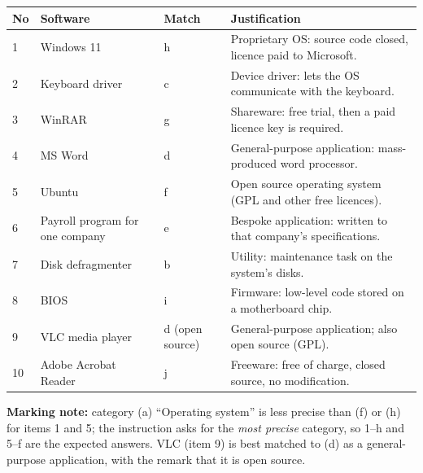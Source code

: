 \documentclass[11pt]{article}
\begin{document}
\begin{corrige}
\begin{center}
\begin{tabularx}{\linewidth}{|l|X|l|X|}
\hline
\rowcolor{popblueL} \textbf{No} & \textbf{Software} & \textbf{Match} & \textbf{Justification} \\
\hline
1 & Windows 11 & h & Proprietary OS: source code closed, licence paid to Microsoft. \\
\hline
2 & Keyboard driver & c & Device driver: lets the OS communicate with the keyboard. \\
\hline
3 & WinRAR & g & Shareware: free trial, then a paid licence key is required. \\
\hline
4 & MS Word & d & General-purpose application: mass-produced word processor. \\
\hline
5 & Ubuntu & f & Open source operating system (GPL and other free licences). \\
\hline
6 & Payroll program for one company & e & Bespoke application: written to that company's specifications. \\
\hline
7 & Disk defragmenter & b & Utility: maintenance task on the system's disks. \\
\hline
8 & BIOS & i & Firmware: low-level code stored on a motherboard chip. \\
\hline
9 & VLC media player & d (open source) & General-purpose application; also open source (GPL). \\
\hline
10 & Adobe Acrobat Reader & j & Freeware: free of charge, closed source, no modification. \\
\hline
\end{tabularx}
\end{center}
\textbf{Marking note:} category (a) ``Operating system'' is less precise than (f) or (h) for items 1 and 5; the instruction asks for the \emph{most precise} category, so 1--h and 5--f are the expected answers. VLC (item 9) is best matched to (d) as a general-purpose application, with the remark that it is open source.
\end{corrige}
\end{document}
